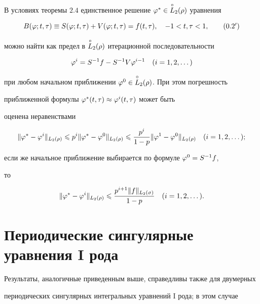 \begin{thms}


В условиях теоремы $2.4$ единственное решение $\varphi^*\in\overset{\circ}{L}{}_2(\rho)$ уравнения 


\begin{equation}


B(\vp;t,\tau)\equiv S(\vp;t,\tau)+V(\vp;t,\tau) =f(t,\tau),\quad -1< t,\tau <1,


\tag{$0.2'$}


\end{equation}


можно найти как предел в $\overset{\circ}{L}{}_2(\rho)$ итерационной последовательности 


$$


\vp^i = S^{-1}f - S^{-1}V\vp^{i-1}\quad (i=1,2,\dotsc)


$$


при любом начальном приближении $\varphi^0\in \overset{\circ}{L}{}_2(\rho)$. При этом погрешность 


приближенной формулы $\varphi^*(t,\tau) \approx \varphi^i(t,\tau)$ может быть 


оценена неравенствами


$$


\|\vp^* - \vp^i\|_{L_2(\rho)} \lea p^i\|\vp^*-\vp^0\|_{L_2(\rho)} \lea


\frac{p^i}{1-p}\|\vp^1-\vp^0\|_{L_2(\rho)}\quad (i=1,2,\dotsc);


$$


если же начальное приближение выбирается по формуле $\varphi^0 = S^{-1}f$, 


то 


$$


\|\vp^*-\vp^i\|_{L_2(\rho)} \lea \frac{p^{i+1}\|f\|_{L_2(\sigma)}}{1-p}


\quad (i=1,2,\dotsc).


$$


\end{thms}








\section{Периодические сингулярные уравнения I рода}





Результаты, аналогичные приведенным выше, справедливы также для двумерных 


периодических сингулярных интегральных уравнений I рода; в этом случае 


